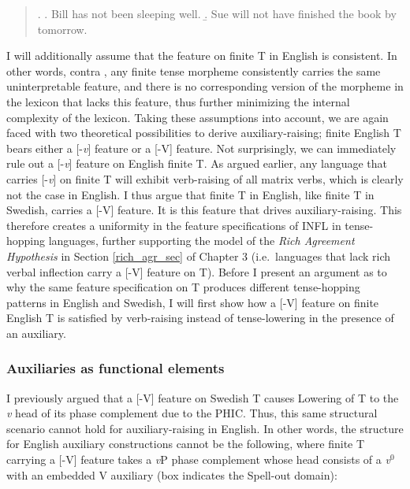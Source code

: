 \singlespacing
\begin{quote}
\ex.
\a. Bill has not been sleeping well.
\b. Sue will not have finished the book by tomorrow.\footnotemark 

\end{quote}
\onehalfspacing 
I will additionally assume that the feature on finite T in English is consistent. In other words, contra \citet{lasnik1995}, any finite tense morpheme consistently carries the same uninterpretable feature, and there is no corresponding version of the morpheme in the lexicon that lacks this feature, thus further minimizing the internal complexity of the lexicon. Taking these assumptions into account, we are again faced with two theoretical possibilities to derive auxiliary-raising; finite English T bears either a [-{\it v}] feature or a [-V] feature. Not surprisingly, we can immediately rule out a [-{\it v}] feature on English finite T. As argued earlier, any language that carries [-{\it v}] on finite T will exhibit verb-raising of all matrix verbs, which is clearly not the case in English. I thus argue that finite T in English, like finite T in Swedish, carries a [-V] feature. It is this feature that drives auxiliary-raising. This therefore creates a uniformity in the feature specifications of INFL in tense-hopping languages, further supporting the model of the {\it Rich Agreement Hypothesis} in Section \ref{rich_agr_sec} of Chapter 3 (i.e.\ languages that lack rich verbal inflection carry a [-V] feature on T). Before I present an argument as to why the same feature specification on T produces different tense-hopping patterns in English and Swedish, I will first show how a [-V] feature on finite English T is satisfied by verb-raising instead of tense-lowering in the presence of an auxiliary.

\subsubsection{Auxiliaries as functional elements}
I previously argued that a [-V] feature on Swedish T causes Lowering of T to the {\it v} head of its phase complement due to the PHIC. Thus, this same structural scenario cannot hold for auxiliary-raising in English. In other words, the structure for English auxiliary constructions cannot be the following, where finite T carrying a [-V] feature takes a {\it v}P phase complement whose head consists of a {\it v}$^{0}$ with an embedded V auxiliary (box indicates the Spell-out domain):

